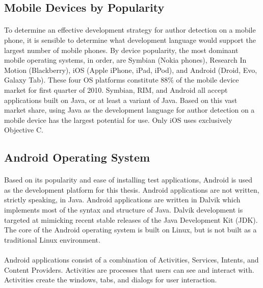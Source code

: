 	\subsection{Mobile Devices by Popularity} 
		\paragraph{}To determine an effective development strategy for author detection on a mobile phone, it is sensible to determine what development language would support the largest number of mobile phones.  By device popularity, the most dominant mobile operating systems, in order,  are Symbian (Nokia phones), Research In Motion (Blackberry), iOS (Apple iPhone, iPad, iPod), and Android (Droid, Evo, Galaxy Tab).  These four OS platforms constitute 88\% of the mobile device market for first quarter of 2010.\cite{_gartner_????}  Symbian, RIM, and Android all accept applications built on Java, or at least a variant of Java. Based on this vast market share, using Java as the development language for author detection on a mobile device has the largest potential for use.\cite{_blackberry_????}\cite{_symbian_????}\cite{murphy_android_2010}  Only iOS uses exclusively Objective C.\cite{_creating_????}  

	\subsection{Android Operating System}
		\paragraph{} Based on its popularity and ease of installing test applications, Android is used as the development platform for this thesis.  Android applications are not written, strictly speaking, in Java.  Android applications are written in Dalvik which implements most of the syntax and structure of Java.  Dalvik development is targeted at mimicking recent stable releases of the Java Development Kit (JDK). The core of the Android operating system is built on Linux, but is not built as a traditional Linux environment.\cite{murphy_android_2010}
		
		\paragraph{} Android applications consist of a combination of Activities, Services, Intents, and Content Providers.  Activities are processes that users can see and interact with. Activities create the windows, tabs, and dialogs for user interaction.  

